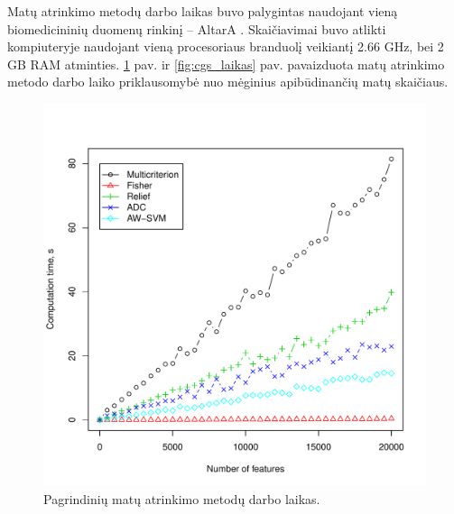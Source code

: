 Matų atrinkimo metodų darbo laikas buvo palygintas naudojant vieną biomedicininių duomenų rinkinį -- AltarA \cite{altara}. Skaičiavimai buvo atlikti kompiuteryje naudojant vieną procesoriaus branduolį veikiantį 2.66 GHz, bei 2 GB RAM atminties. \ref{fig:visu_laikas} pav. ir \ref{fig:cgs_laikas} pav. pavaizduota matų atrinkimo metodo darbo laiko priklausomybė nuo mėginius apibūdinančių matų skaičiaus. 
\begin{figure}[hq]
\begin{minipage}[b]{0.5\linewidth}
\centering
\includegraphics[width=1\textwidth]{images/all_performance.pdf}
 \caption{Pagrindinių matų atrinkimo metodų darbo laikas.}
 \label{fig:visu_laikas}
\end{minipage}
\hspace{0.2cm}
\begin{minipage}[b]{0.5\linewidth}
\centering

\end{minipage}
\end{figure}
